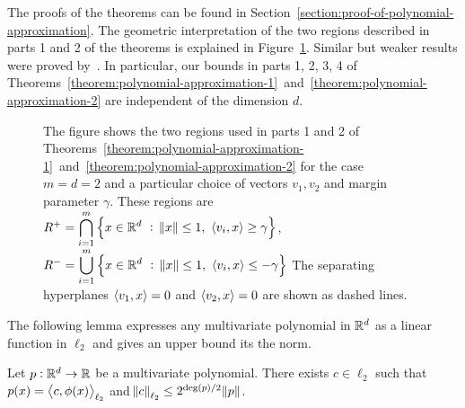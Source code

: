 The proofs of the theorems can be found in
Section~\ref{section:proof-of-polynomial-approximation}. The geometric
interpretation of the two regions described in parts 1 and 2 of the theorems is
explained in Figure~\ref{figure:pizza-slice}. Similar but weaker results were
proved by~\citet{Klivans-Servedio-2008}. In particular, our bounds in parts 1,
2, 3, 4 of
Theorems~\ref{theorem:polynomial-approximation-1}~and~\ref{theorem:polynomial-approximation-2}
are independent of the dimension $d$.

\begin{figure}
\begin{center}

\end{center}
\caption[]{The figure shows the two regions used in parts 1 and 2 of
Theorems~\ref{theorem:polynomial-approximation-1}~and~\ref{theorem:polynomial-approximation-2}
for the case $m=d=2$ and a particular choice of vectors $v_1, v_2$ and margin
parameter $\gamma$. These regions are
$R^+ = \displaystyle \bigcap_{i=1}^m \left\{ x \in \mathbb{R}^d ~:~ \norm{x} \le 1, \ \left\langle v_i, x \right\rangle \ge \gamma \right\}$,
$R^- = \displaystyle \bigcup_{i=1}^m \left\{ x \in \mathbb{R}^d ~:~ \norm{x} \le 1, \ \left\langle v_i, x \right\rangle \le - \gamma \right\}$
The separating hyperplanes $\left\langle v_1, x \right\rangle = 0$ and $\left\langle v_2, x \right\rangle = 0$ are shown as dashed lines.}
\label{figure:pizza-slice}
\end{figure}



The following lemma expresses any multivariate polynomial in $\mathbb{R}^d$
as a linear function in $\ell_2$ and gives an upper bound its the norm.

\begin{lemma}
\label{lemma:norm-bound}
Let $p:\mathbb{R}^d \to \mathbb{R}$ be a multivariate polynomial.
There exists $c \in \ell_2$ such that $p(x) = \left\langle c, \phi(x) \right\rangle_{\ell_2}$
and $\norm{c}_{\ell_2} \le 2^{\deg(p)/2} \norm{p}$.
\end{lemma}

